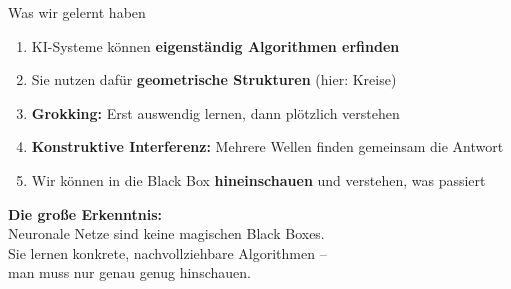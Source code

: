 \documentclass[aspectratio=169, 12pt]{beamer}
\begin{document}
\begin{frame}{Was wir gelernt haben}
  \begin{enumerate}
    \item[\color{akzent}\textbf{1.}] KI-Systeme k\"onnen \textbf{eigenst\"andig Algorithmen erfinden}
    \item[\color{akzent}\textbf{2.}] Sie nutzen daf\"ur \textbf{geometrische Strukturen} (hier: Kreise)
    \item[\color{akzent}\textbf{3.}] \textbf{Grokking:} Erst auswendig lernen, dann pl\"otzlich verstehen
    \item[\color{akzent}\textbf{4.}] \textbf{Konstruktive Interferenz:} Mehrere Wellen finden gemeinsam die Antwort
    \item[\color{akzent}\textbf{5.}] Wir k\"onnen in die Black Box \textbf{hineinschauen} und verstehen, was passiert
  \end{enumerate}

  \bigskip
  \begin{center}
    \colorbox{dunkel!10}{%
      \parbox{0.85\textwidth}{\centering
        \textbf{Die gro\ss e Erkenntnis:}\\[4pt]
        Neuronale Netze sind keine magischen Black Boxes.\\
        Sie lernen konkrete, nachvollziehbare Algorithmen --\\
        man muss nur genau genug hinschauen.
      }%
    }
  \end{center}
\end{frame}


\begin{frame}[plain]
  {
  }
\end{frame}

\end{document}
